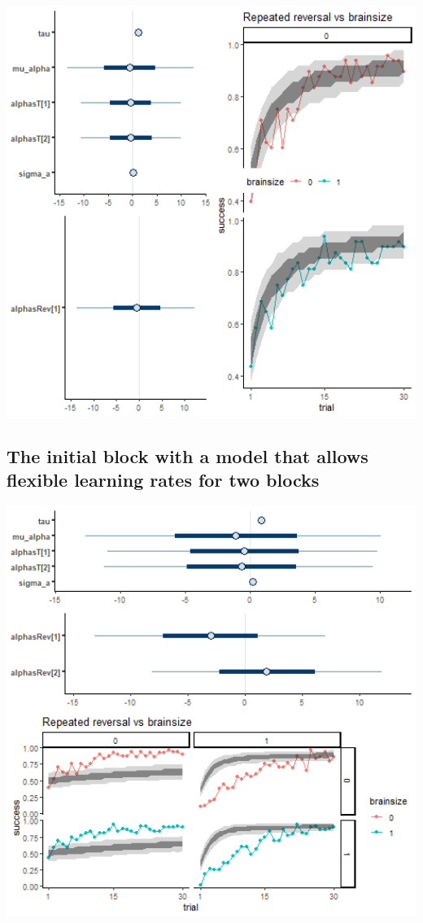 \documentclass[
]{article}
\begin{document}
\begin{flushleft}\includegraphics[width=6.67in,]{images/boussard_short_0_rev} \end{flushleft}

\hypertarget{the-initial-block-with-a-model-that-allows-flexible-learning-rates-for-two-blocks}{%
\subsection{The initial block with a model that allows flexible learning
rates for two
blocks}\label{the-initial-block-with-a-model-that-allows-flexible-learning-rates-for-two-blocks}}

\begin{flushleft}\includegraphics[width=6.67in,]{images/boussard_short_01_rev} \end{flushleft}
\end{document}
